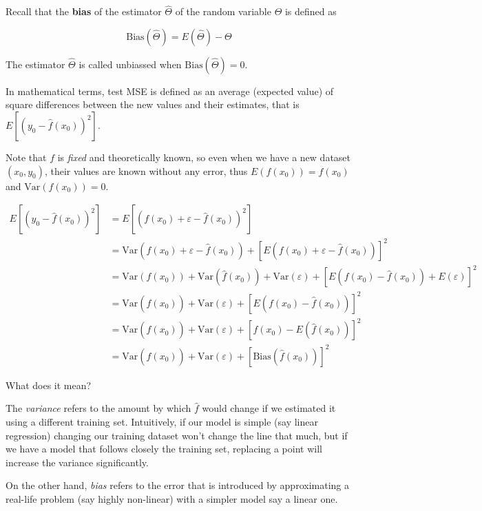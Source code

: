 \documentclass[11pt]{article}
\begin{document}
Recall that the \textbf{bias} of the estimator \(\hat{\Theta}\) of the
random variable \(\Theta\) is defined as

\begin{equation}
\mathrm{Bias}(\hat{\Theta})= E(\hat{\Theta}) - \Theta 
\end{equation}

The estimator \(\hat{\Theta}\) is called unbiassed when
\(\mathrm{Bias}(\hat{\Theta})=0\).

In mathematical terms, test MSE is defined as an average (expected
value) of square differences between the new values and their estimates,
that is \(E[(y_0-\hat{f}(x_0))^2]\).

Note that \(f\) is \emph{fixed} and theoretically known, so even when we
have a new dataset \((x_0,y_0)\), their values are known without any
error, thus \(E(f(x_0))=f(x_0)\) and \(\mathrm{Var}(f(x_0))=0\).

\begin{equation}
\label{eq:bias-variance}
\begin{split}
E\left[ (y_0- \hat{f}(x_0))^2 \right] &= E[ (f(x_0)+ \varepsilon - \hat{f}(x_0))^2 ]\\
&= \mathrm{Var}(f(x_0) + \varepsilon - \hat{f}(x_0)) + \left[ E(f(x_0)+\varepsilon -\hat{f}(x_0))\right]^2 \\
&= \mathrm{Var}(f(x_0))+ \mathrm{Var}(\hat{f}(x_0)) + \mathrm{Var}(\varepsilon) + 
\left[ E(f(x_0)-\hat{f}(x_0))+ E(\varepsilon)\right]^2\\
&= \mathrm{Var}(\hat{f}(x_0)) +\mathrm{Var}(\varepsilon) + \left[ E(f(x_0)-\hat{f}(x_0))\right]^2\\
&= \mathrm{Var}(\hat{f}(x_0)) +\mathrm{Var}(\varepsilon) + \left[ f(x_0) - E(\hat{f}(x_0))\right]^2\\
&= \mathrm{Var}(\hat{f}(x_0)) +\mathrm{Var}(\varepsilon) + \left[\mathrm{Bias}(\hat{f}(x_0)) \right]^2
\end{split}
\end{equation}

What does it mean?

The \emph{variance} refers to the amount by which \(\hat{f}\) would
change if we estimated it using a different training set. Intuitively,
if our model is simple (say linear regression) changing our training
dataset won't change the line that much, but if we have a model that
follows closely the training set, replacing a point will increase the
variance significantly.

On the other hand, \emph{bias} refers to the error that is introduced by
approximating a real-life problem (say highly non-linear) with a simpler
model say a linear one.
\end{document}
